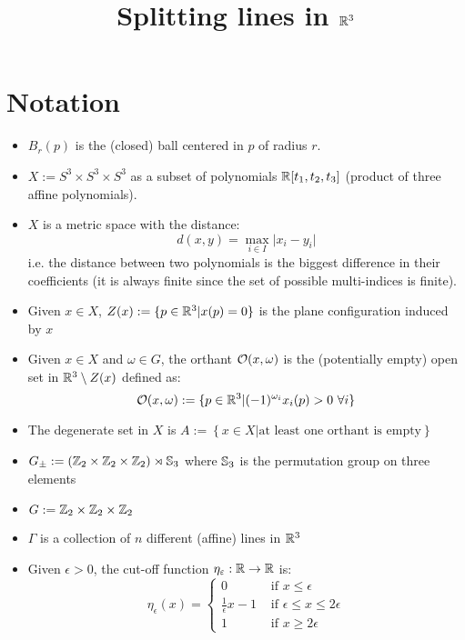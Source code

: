 \documentclass[9pt]{article}
\title{Splitting lines in $\mathbb{R}^3$}
\date{}
\author{}
\begin{document}
\maketitle
\section*{Notation}
\begin{itemize}
\item $B_r(p)$ is the (closed) ball centered in $p$ of radius $r$.
\item $X := S^3\times S^3 \times S^3$ as a subset of polynomials $\mathbb{R}[t_1, t_2, t_3]$ (product of three affine polynomials).
\item $X$ is a metric space with the distance:
  \[
    d(x,y) = \max_{i\in I}\vert x_i - y_i\vert
  \]
  i.e. the distance between two polynomials is the biggest difference in their coefficients (it is always finite since the set of possible multi-indices is finite).
  
    \item Given $x\in X$, $Z(x) := \{p\in \mathbb{R}^3 \vert x(p) = 0\}$ is the plane configuration induced by $x$
    \item Given $x\in X$ and $\omega \in G$, the orthant $\mathcal{O}(x, \omega)$ is the (potentially empty) open set in $\mathbb{R}^3 \setminus Z(x)$ defined as:
    \[
        \mathcal{O}(x, \omega) := \{p\in \mathbb{R}^3\vert (-1)^{\omega_i}x_i(p)>0\ \forall i\}
    \]

    \item The degenerate set in $X$ is
     $A :=\left\{x\in X \vert \mbox{at least one orthant is empty}\right\}$
    \item $G_\pm :=  \left(\mathbb{Z}_2\times \mathbb{Z}_2 \times \mathbb{Z}_2\right) \rtimes \mathbb{S}_3$ where $\mathbb{S}_3$ is the permutation group on three elements
    \item $G := \mathbb{Z}_2\times \mathbb{Z}_2 \times \mathbb{Z}_2$
    \item $\Gamma$ is a collection of $n$ different (affine) lines in $\mathbb{R}^3$
    \item Given $\epsilon>0$, the cut-off function $\eta_\varepsilon: \mathbb{R} \rightarrow \mathbb{R}$ is:
    \[
        \eta_\epsilon(x)= \begin{cases}
            0 & \mbox{ if }x\leq \epsilon\\
            \frac{1}{\epsilon}x -1 & \mbox{ if }\epsilon\leq x \leq 2\epsilon\\
            1 & \mbox{ if } x\geq 2\epsilon
        \end{cases}
      \]
\end{itemize}
\end{document}
